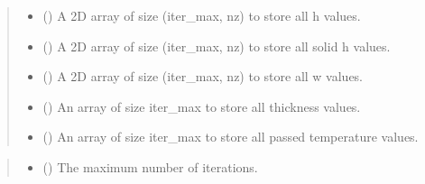 \documentclass[a4paper,11pt,english,openany]{sphinxmanual}
\begin{document}
\begin{fulllineitems}
\begin{quote}
\begin{description}
\begin{itemize}
\item {} 
\sphinxAtStartPar
{} () \textendash{} A 2D array of size (iter\_max, nz) to store all h values.

\item {} 
\sphinxAtStartPar
{} () \textendash{} A 2D array of size (iter\_max, nz) to store all solid h values.

\item {} 
\sphinxAtStartPar
{} () \textendash{} A 2D array of size (iter\_max, nz) to store all w values.

\item {} 
\sphinxAtStartPar
{} () \textendash{} An array of size iter\_max to store all thickness values.

\item {} 
\sphinxAtStartPar
{} () \textendash{} An array of size iter\_max to store all passed temperature values.

\end{itemize}

\end{description}\end{quote}

\begin{fulllineitems}
\label{\detokenize{api/spyice.parameters.results_params:spyice.parameters.results_params.ResultsParams.__init__}}
\pysigstartsignatures
{}
\pysigstopsignatures\begin{quote}\begin{description}
\begin{itemize}
\item {} 
\sphinxAtStartPar
{} () \textendash{} The maximum number of iterations.


\end{itemize}
\end{description}
\end{quote}
\end{fulllineitems}
\end{fulllineitems}
\end{document}
